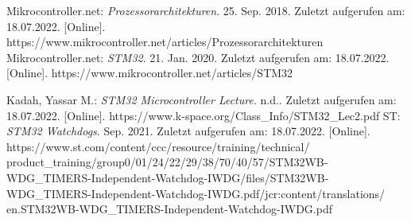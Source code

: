 \documentclass[a4paper,
DIV=13,
12pt,
BCOR=10mm,
department=FakIM,
oneside,
parskip=half,
automark,
listof=totocnumbered,
bibliography=totocnumbered,
acronym=totocnumbered
] {OTHRartcl}
\begin{document}
\begin{appendix}
\begin{thebibliography}{99}
 Mikrocontroller.net: \textit{Prozessorarchitekturen}. 25. Sep. 2018. Zuletzt aufgerufen am: 18.07.2022. [Online]. https://www.mikrocontroller.net/articles/Prozessorarchitekturen
 Mikrocontroller.net: \textit{STM32}. 21. Jan. 2020. Zuletzt aufgerufen am: 18.07.2022. [Online]. https://www.mikrocontroller.net/articles/STM32

 Kadah, Yassar M.: \textit{STM32 Microcontroller Lecture}. n.d.. Zuletzt aufgerufen am: 18.07.2022. [Online]. https://www.k-space.org/Class\_Info/STM32\_Lec2.pdf
 ST: \textit{STM32 Watchdogs}. Sep. 2021. Zuletzt aufgerufen am: 18.07.2022. [Online]. https://www.st.com/content/ccc/resource/training/technical/ product\_training/group0/01/24/22/29/38/70/40/57/STM32WB-WDG\_TIMERS-Independent-Watchdog-IWDG/files/STM32WB-WDG\_TIMERS-Independent-Watchdog-IWDG.pdf/jcr:content/translations/ en.STM32WB-WDG\_TIMERS-Independent-Watchdog-IWDG.pdf
\end{thebibliography}

\cleardoublepage
\makedeclaration
\end{appendix}
\end{document}
